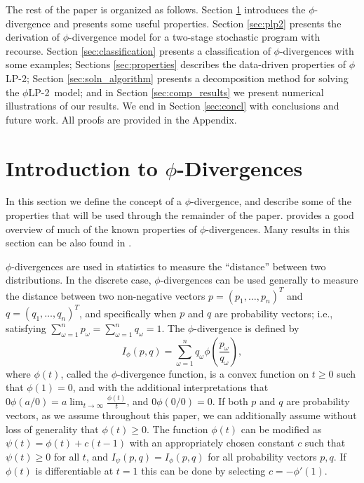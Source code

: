 \documentclass[opre,nonblindrev]{informs3} %
\newcommand{\plp}{$\phi$LP-2}
\begin{document}
The rest of the paper is organized as follows.
Section \ref{sec:phi_divergences} introduces the $\phi$-divergence and presents some useful properties.
Section \ref{sec:plp2} presents the derivation of $\phi$-divergence model for a two-stage stochastic program with recourse.
Section \ref{sec:classification} presents a classification of $\phi$-divergences with some examples;
Sections \ref{sec:properties} describes the data-driven properties of \plp; 
Section \ref{sec:soln_algorithm} presents a decomposition method for solving the \plp\ model; and in Section \ref{sec:comp_results} we present numerical illustrations of our results. 
We end in Section \ref{sec:concl} with conclusions and future work.
All proofs are provided in the Appendix.

\section{Introduction to $\phi$-Divergences}
\label{sec:phi_divergences}

In this section we define the concept of a $\phi$-divergence, and describe some of the properties that will be used through the remainder of the paper.
\cite{pardo2005statistical} provides a good overview of much of the known properties of $\phi$-divergences.
Many results in this section can be also found in \citep{bental2011robust}.

$\phi$-divergences are used in statistics to measure the ``distance'' between two distributions. 
In the discrete case, $\phi$-divergences can be used generally to measure the distance between two non-negative vectors $p = (p_1, \dots, p_n)^T$ and $q = (q_1, \dots, q_n)^T$, and specifically when $p$ and $q$ are probability vectors; i.e., satisfying $\sum_{\omega=1}^n p_\omega = \sum_{\omega=1}^n q_\omega = 1$.
The $\phi$-divergence is defined by
\[
	I_\phi(p,q) = \sum_{\omega=1}^n q_\omega \phi\left(\frac{p_\omega}{q_\omega}\right),
\]
where $\phi(t)$, called the $\phi$-divergence function, is a convex function on $t \geq 0$ such that $\phi(1) = 0$, and with the additional interpretations that $0 \phi(a/0) = a \lim_{t \rightarrow \infty} \frac{\phi(t)}{t}$, and $0 \phi(0/0) = 0$.
If both $p$ and $q$ are probability vectors, as we assume throughout this paper, we can additionally assume without loss of generality that $\phi(t) \geq 0$.
The function $\phi(t)$ can be modified as $\psi(t) = \phi(t) + c(t-1)$ with an appropriately chosen constant $c$ such that $\psi(t) \geq 0$ for all $t$, and $I_\psi(p,q) = I_\phi(p,q)$ for all probability vectors $p,q$.
If $\phi(t)$ is differentiable at $t = 1$ this can be done by selecting $c = -\phi'(1)$.
\end{document}
